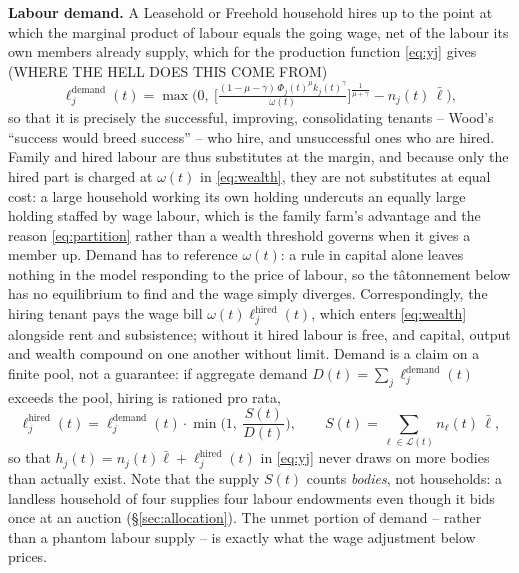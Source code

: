 \documentclass[11pt,english]{article}
\begin{document}
\textbf{Labour demand.} A Leasehold or Freehold household hires up to the point at which the marginal product of labour equals the going wage, net of the labour its own members already supply, which for the production function \eqref{eq:yj} gives (WHERE THE HELL DOES THIS COME FROM)
\begin{equation}
\ell_j^{\text{demand}}(t) = \max\!\Big(0,\ \Big[\tfrac{(1-\mu-\gamma)\,\Phi_j(t)^{\mu} k_j(t)^{\gamma}}{\omega(t)}\Big]^{\frac{1}{\mu+\gamma}} - n_j(t)\,\bar\ell\Big),
\end{equation}
so that it is precisely the successful, improving, consolidating tenants -- Wood's ``success would breed success'' \cite[p.100-101]{wood2002origin} -- who hire, and unsuccessful ones who are hired. Family and hired labour are thus substitutes at the margin, and because only the hired part is charged at $\omega(t)$ in \eqref{eq:wealth}, they are not substitutes at equal cost: a large household working its own holding undercuts an equally large holding staffed by wage labour, which is the family farm's advantage and the reason \eqref{eq:partition} rather than a wealth threshold governs when it gives a member up. Demand has to reference $\omega(t)$: a rule in capital alone leaves nothing in the model responding to the price of labour, so the t\^atonnement below has no equilibrium to find and the wage simply diverges. Correspondingly, the hiring tenant pays the wage bill $\omega(t)\ell_j^{\text{hired}}(t)$, which enters \eqref{eq:wealth} alongside rent and subsistence; without it hired labour is free, and capital, output and wealth compound on one another without limit. Demand is a claim on a finite pool, not a guarantee: if aggregate demand $D(t)=\sum_j \ell_j^{\text{demand}}(t)$ exceeds the pool, hiring is rationed pro rata,
\begin{equation}
\ell_j^{\text{hired}}(t) = \ell_j^{\text{demand}}(t)\cdot\min\!\Big(1,\ \frac{S(t)}{D(t)}\Big),
\qquad S(t) = \sum_{\ell\in\mathcal{L}(t)} n_\ell(t)\,\bar\ell,
\end{equation}
so that $h_j(t)=n_j(t)\bar\ell+\ell_j^{\text{hired}}(t)$ in \eqref{eq:yj} never draws on more bodies than actually exist. Note that the supply $S(t)$ counts \emph{bodies}, not households: a landless household of four supplies four labour endowments even though it bids once at an auction (\S\ref{sec:allocation}). The unmet portion of demand -- rather than a phantom labour supply -- is exactly what the wage adjustment below prices.
\end{document}
